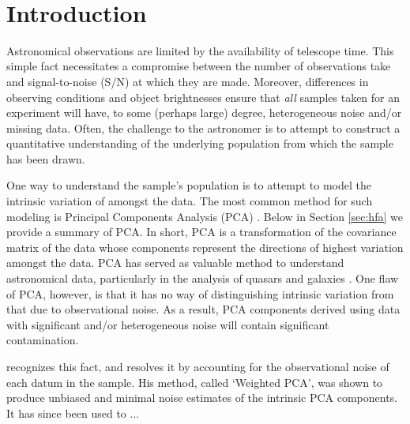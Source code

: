 \documentclass[12pt,preprint]{aastex}
\begin{document}

~\clearpage

\noindent

\section{Introduction}

Astronomical observations are limited by the availability of telescope 
time.  This simple fact necessitates a compromise between the number of 
observations take and signal-to-noise (S/N) at which they are made.  
Moreover, differences in observing conditions and object brightnesses 
ensure that \emph{all} samples taken for an experiment will have, 
to some (perhaps large) degree, heterogeneous noise and/or missing data.  
Often, the challenge to the astronomer is to attempt to construct a 
quantitative understanding of the underlying population from which the 
sample has been drawn.

One way to understand the sample's population is to attempt to model the 
intrinsic variation of amongst the data.  The most common method for such 
modeling is Principal Components Analysis (PCA) \citep{pearson01, hotelling33, 
karhunen47, loeve48}.  Below in Section 
\ref{sec:hfa} we provide a summary of PCA.  In short, PCA is a transformation 
of the covariance matrix of the data whose components represent the directions 
of highest variation amongst the data.  PCA has served as valuable method to 
understand astronomical data, particularly in the analysis of quasars \citep[e.g.,][]{boroson92, 
yip04b} and 
galaxies \citep[e.g.,][]{connolly95, yip04a}.  One flaw of PCA, however, is that it has no way of distinguishing 
intrinsic variation from that due to observational noise.  As a result, PCA components 
derived using data with significant and/or heterogeneous noise will contain 
significant contamination.  

\citet{bailey12} recognizes this fact, and resolves it 
by accounting for the observational noise of each datum in the sample.  His method, 
called `Weighted PCA', was shown to produce unbiased and minimal noise estimates 
of the intrinsic PCA components.  It has since been used to ...
\end{document}
